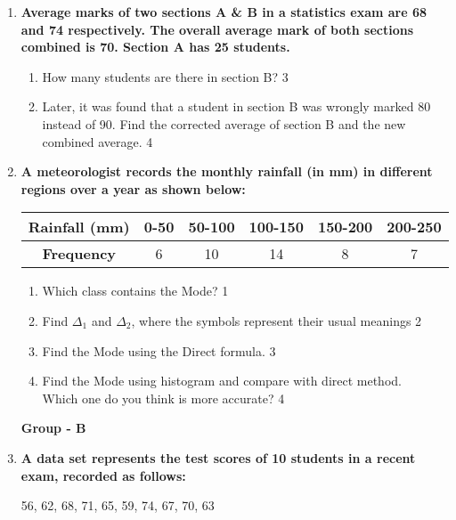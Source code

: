 \documentclass[12pt]{article}
\begin{document}
\begin{enumerate}
\item
\textbf{Average marks of two sections A \& B in a statistics exam are 68 and 74 respectively. The overall average mark of both sections combined is 70. Section A has 25 students.}

\begin{enumerate}
    \item  
    How many students are there in section B? \hfill 3
    \item
    Later, it was found that a student in section B was wrongly marked 80 instead of 90. Find the corrected average of section B and the new combined average. \hfill 4
\end{enumerate}

  
  
   \item
	  \textbf{A meteorologist records the monthly rainfall (in mm) in different regions over a year as shown below:}

\begin{table}[h]
\centering
\begin{tabular}{c|c|c|c|c|c}
\textbf{Rainfall (mm)} & 0-50 & 50-100 & 100-150 & 150-200 & 200-250 \\ \hline
\textbf{Frequency}     & 6    & 10     & 14      & 8       & 7       
\end{tabular}
\end{table}

  
  \begin{enumerate}
    \item
	Which class contains the Mode? \hfill 1
    \item
	Find $\Delta_1$ and $\Delta_2$, where the symbols represent their usual meanings \hfill 2
    \item  
	Find the Mode using the Direct formula. \hfill 3
    \item
	Find the Mode using histogram and compare with direct method. \\ Which one do you think is more accurate? \hfill 4
  \end{enumerate}


\begin{center}
\textbf{Group  - B}
\end{center}

  \item
\textbf{A data set represents the test scores of 10 students in a recent exam, recorded as follows:}

\begin{center}
56, 62, 68, 71, 65, 59, 74, 67, 70, 63
\end{center}


\end{enumerate}
\end{document}
